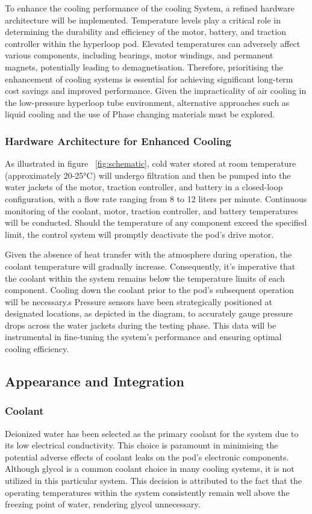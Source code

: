 To enhance the cooling performance of the cooling System, a refined hardware architecture will be implemented. Temperature levels play a critical role in determining the durability and efficiency of the motor, battery, and traction controller within the hyperloop pod. Elevated temperatures can adversely affect various components, including bearings, motor windings, and permanent magnets, potentially leading to demagnetisation. Therefore, prioritising the enhancement of cooling systems is essential for achieving significant long-term cost savings and improved performance. Given the impracticality of air cooling in the low-pressure hyperloop tube environment, alternative approaches such as liquid cooling and the use of Phase changing materials must be explored.

\subsubsection{Hardware Architecture for Enhanced Cooling}

As illustrated in  figure ~\ref{fig:schematic}, cold water stored at room temperature (approximately 20-25°C) will undergo filtration and then be pumped into the water jackets of the motor, traction controller, and battery in a closed-loop configuration, with a flow rate ranging from 8 to 12 liters per minute. Continuous monitoring of the coolant, motor, traction controller, and battery temperatures will be conducted. Should the temperature of any component exceed the specified limit, the control system will promptly deactivate the pod's drive motor.

Given the absence of heat transfer with the atmosphere during operation, the coolant temperature will gradually increase. Consequently, it's imperative that the coolant within the system remains below the temperature limits of each component. Cooling down the coolant prior to the pod's subsequent operation will be necessary.s
Pressure sensors have been strategically positioned at designated locations, as depicted in the diagram, to accurately gauge pressure drops across the water jackets during the testing phase. This data will be instrumental in fine-tuning the system's performance and ensuring optimal cooling efficiency.

\subsection{Appearance and Integration}
\subsubsection{Coolant }
Deionized water has been selected as the primary coolant for the system due to its low electrical conductivity. This choice is paramount in minimising the potential adverse effects of coolant leaks on the pod's electronic components. Although glycol is a common coolant choice in many cooling systems, it is not utilized in this particular system. This decision is attributed to the fact that the operating temperatures within the system consistently remain well above the freezing point of water, rendering glycol unnecessary.
